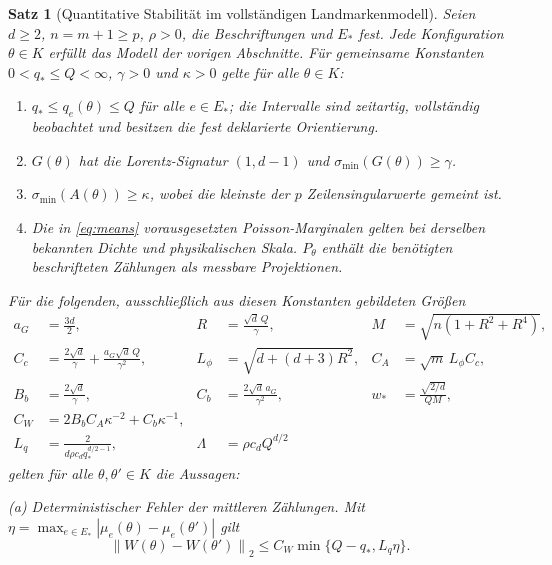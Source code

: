 \documentclass[11pt,a4paper]{article}
\newtheorem{theorem}{Satz}
\theoremstyle{definition}\newtheorem{definition}{Definition}
\theoremstyle{remark}\newtheorem*{remark}{Bemerkung}
\newcommand{\norm}[1]{\left\lVert#1\right\rVert}
\newcommand{\smin}{\sigma_{\min}}
\begin{document}
\begin{theorem}[Quantitative Stabilität im vollständigen Landmarkenmodell]\label{thm:quant}
Seien $d\geq2$, $n=m+1\geq p$, $\rho>0$, die Beschriftungen und $E_*$ fest. Jede Konfiguration $\theta\in K$ erfüllt das Modell der vorigen Abschnitte. Für gemeinsame Konstanten
$0<q_*\leq Q<\infty$, $\gamma>0$ und $\kappa>0$ gelte \emph{für alle} $\theta\in K$:
\begin{enumerate}[label=(H\arabic*)]
 \item $q_*\leq q_e(\theta)\leq Q$ für alle $e\in E_*$; die Intervalle sind zeitartig, vollständig beobachtet und besitzen die fest deklarierte Orientierung.
 \item $G(\theta)$ hat die Lorentz-Signatur $(1,d-1)$ und $\smin(G(\theta))\geq\gamma$.
 \item $\smin(A(\theta))\geq\kappa$, wobei die kleinste der $p$ Zeilensingularwerte gemeint ist.
 \item Die in \eqref{eq:means} vorausgesetzten Poisson-Marginalen gelten bei derselben bekannten Dichte und physikalischen Skala. $P_\theta$ enthält die benötigten beschrifteten Zählungen als messbare Projektionen.
\end{enumerate}
Für die folgenden, ausschließlich aus diesen Konstanten gebildeten Größen
\begin{align}
 a_G&=\frac{3d}{2},&
 R&=\frac{\sqrt d\,Q}{\gamma},&
 M&=\sqrt{n(1+R^2+R^4)},\label{eq:constants1}\\
 C_c&=\frac{2\sqrt d}{\gamma}
       +\frac{a_G\sqrt d\,Q}{\gamma^2},&
 L_\phi&=\sqrt{d+(d+3)R^2},&
 C_A&=\sqrt m\,L_\phi C_c,\\
 B_b&=\frac{2\sqrt d}{\gamma},&
 C_b&=\frac{2\sqrt d\,a_G}{\gamma^2},&
 w_*&=\frac{\sqrt{2/d}}{QM},\label{eq:constants2}\\
 C_W&=2B_bC_A\kappa^{-2}+C_b\kappa^{-1},\label{eq:CW}\\
 L_q&=\frac{2}{d\rho c_d q_*^{d/2-1}},&
 \Lambda&=\rho c_dQ^{d/2}\label{eq:constants3}
\end{align}
gelten für \emph{alle} $\theta,\theta'\in K$ die Aussagen:

\textnormal{(a) Deterministischer Fehler der mittleren Zählungen.} Mit
$\eta=\max_{e\in E_*}|\mu_e(\theta)-\mu_e(\theta')|$ gilt
\begin{equation}\label{eq:det}
 \norm{W(\theta)-W(\theta')}_2
 \leq C_W\min\{Q-q_*,L_q\eta\}.
\end{equation}


\end{theorem}
\end{document}
